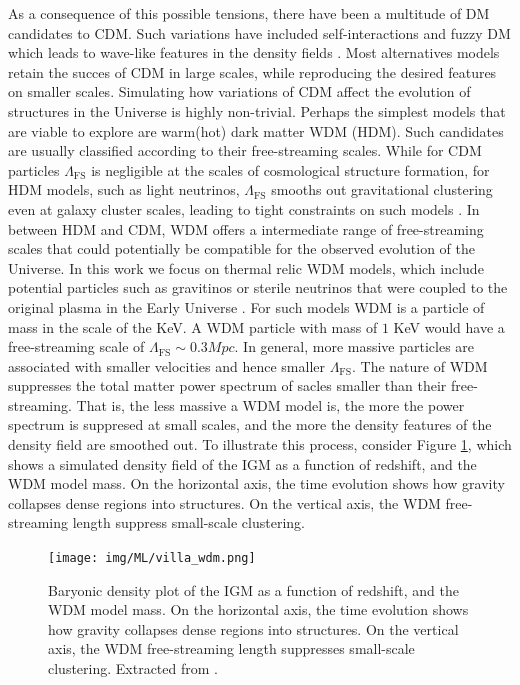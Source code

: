 As a consequence of this possible tensions, there have been a multitude of DM candidates to CDM. Such variations have included self-interactions \cite{Spergel2000} and fuzzy DM which leads to wave-like features in the density fields \cite{Hu2000}. Most alternatives models retain the succes of CDM in large scales, while reproducing the desired features on smaller scales. Simulating how variations of CDM affect the evolution of structures in the Universe is highly non-trivial. Perhaps the simplest models that are viable to explore are warm(hot) dark matter WDM (HDM). Such candidates are usually classified according to their free-streaming scales. While for CDM particles $\Lambda_\mathrm{FS}$ is negligible at the scales of cosmological structure formation, for HDM models, such as light neutrinos, $\Lambda_\mathrm{FS}$ smooths out gravitational clustering even at galaxy cluster scales, leading to tight constraints on such models \cite{Hannestad_2004}. In between HDM and CDM, WDM offers a intermediate range of free-streaming scales that could potentially be compatible for the observed evolution of the Universe. In this work we focus on thermal relic WDM models, which include potential particles such as gravitinos or sterile neutrinos that were coupled to the original plasma in the Early Universe \cite{Viel_2005}. For such models WDM is a particle of mass in the scale of the KeV. A WDM particle with mass of $1$ KeV would have a free-streaming scale of $\Lambda_\mathrm{FS} \sim 0.3 Mpc$. In general, more massive particles are associated with smaller velocities and hence smaller $\Lambda_\mathrm{FS}$. The nature of WDM suppresses the total matter power spectrum of sacles smaller than their free-streaming. That is, the less massive a WDM model is, the more the power spectrum is suppresed at small scales, and the more the density features of the density field are smoothed out.
To illustrate this process, consider Figure \ref{fig:villasenor_wdm}, which shows a simulated density field of the IGM as a function of redshift, and the WDM model mass. On the horizontal axis, the time evolution shows how gravity collapses dense regions into structures. On the vertical axis, the WDM free-streaming length suppress small-scale clustering. 

\begin{figure}[ht]
    \centering
    \texttt{[image: img/ML/villa\_wdm.png]}
    \caption{Baryonic density plot of the IGM as a function of redshift, and the WDM model mass. On the horizontal axis, the time evolution shows how gravity collapses dense regions into structures. On the vertical axis, the WDM free-streaming length suppresses small-scale clustering. Extracted from \cite{Villasenor_2023}.}
    \label{fig:villasenor_wdm}
\end{figure}

